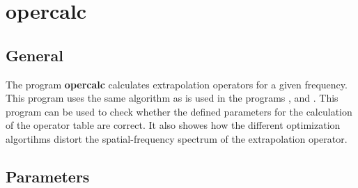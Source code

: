 \newpage
\section{opercalc} \label{opercalc}

\subsection{General}
The program {\bf opercalc} calculates extrapolation operators for a given frequency. This program uses the same algorithm as is used in the programs ,  and . This program can be used to check whether the defined parameters for the calculation of the operator table are correct. It also showes how the different optimization algortihms distort the spatial-frequency spectrum of the extrapolation operator.

\subsection{Parameters}

